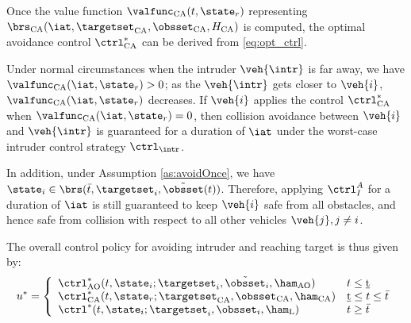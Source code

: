 Once the value function $\valfunc_\text{CA}(t, \state_r)$ representing $\brs_\text{CA}(\iat, \targetset_\text{CA}, \obsset_\text{CA}, H_\text{CA})$ is computed, the optimal avoidance control $\ctrl^*_\text{CA}$ can be derived from \eqref{eq:opt_ctrl}.

Under normal circumstances when the intruder $\veh{\intr}$ is far away, we have $\valfunc_\text{CA}(\iat, \state_r) > 0$; as the $\veh{\intr}$ gets closer to $\veh{i}$, $\valfunc_\text{CA}(\iat, \state_r)$ decreases. If $\veh{i}$ applies the control $\ctrl^*_\text{CA}$ when $\valfunc_\text{CA}(\iat, \state_r) = 0$, then collision avoidance between $\veh{i}$ and $\veh{\intr}$ is guaranteed for a duration of $\iat$ under the worst-case intruder control strategy $\ctrl_\intr$.

In addition, under Assumption \ref{as:avoidOnce}, we have $\state_i \in \brs(\bar t, \targetset_i, \tilde\obsset(t))$. Therefore, applying $\ctrl_I^A$ for a duration of $\iat$ is still guaranteed to keep $\veh{i}$ safe from all obstacles, and hence safe from collision with respect to all other vehicles $\veh{j}, j \neq i$.


The overall control policy for avoiding intruder and reaching target is thus given by:
\begin{equation*}
u^* = 
\left \{ 
\begin{array}{ll}
\ctrl^*_\text{AO}(t, \state_i; \targetset_i, \tilde\obsset_i, \ham_\text{AO}) & t \leq \underbar{t}\\
\ctrl^*_\text{CA}(t, \state_r; \targetset_\text{CA}, \obsset_\text{CA}, \ham_\text{CA}) & \underbar{t} \leq t \leq \bar{t} \\
\ctrl^*(t, \state_i; \targetset_i, \obsset_i, \ham_\text{L}) & t \geq \bar{t}
\end{array}
\right.
\end{equation*}